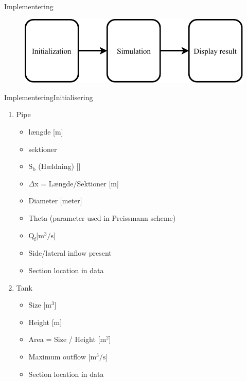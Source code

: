 \begin{frame}{Implementering}{}
 \vfill\vfill\centering  
\begin{figure}[H]
\centering
\includegraphics[width=0.75 \textwidth]{figures/Basic_implementation}
\label{fig:Basic_Implementering}
\end{figure}
 \vfill\vfill

\end{frame}
\begin{frame}{Implementering}{Initialisering}
    
\begin{table}[H]
\begin{enumerate} 
	\item Pipe
	\begin{itemize}
		\item længde [m]
		\item sektioner 
		\item $\text{S}_\text{b}$ (Hældning) [\textperthousand]
		\item $\Delta$x = Længde/Sektioner [m]
		\item Diameter [meter]
		\item Theta (parameter used in Preissmann scheme)
		\item $\text{Q}_{\text{f}}$[$\text{m}^\text{3}/\text{s}$]
		\item Side/lateral inflow present 
		\item Section location in data 
	\end{itemize}
	\item Tank
	\begin{itemize}
		\item Size [$\text{m}^\text{3}$]
		\item Height [m]
		\item Area = Size / Height [$\text{m}^\text{2}$]
		\item Maximum outflow [$\text{m}^\text{3}/\text{s}$]
		\item Section location in data 
	\end{itemize}
	
\end{enumerate}
\label{tab:init_list}
\end{table}

\end{frame}


